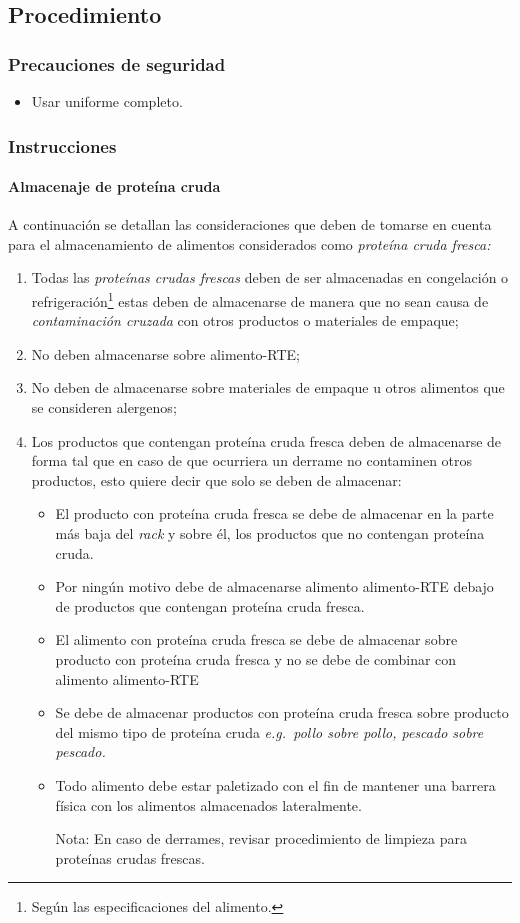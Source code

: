 \subsection{Procedimiento}
\subsubsection{Precauciones de seguridad}
	\begin{itemize}
		\item Usar uniforme completo.
	\end{itemize}

\subsubsection{Instrucciones}
\paragraph{Almacenaje de proteína cruda}
A continuación se detallan las consideraciones que deben de tomarse en cuenta para el almacenamiento de alimentos considerados como \emph{proteína cruda fresca:}
	\begin{enumerate}
		\item Todas las \emph{proteínas crudas frescas} deben de ser almacenadas en congelación o refrigeración\footnote{Según las especificaciones del alimento.} estas deben de almacenarse de manera que no sean causa de \emph{contaminación cruzada} con otros productos o materiales de empaque;
		\item No deben almacenarse sobre \gls{alimento-RTE};
		\item No deben de almacenarse sobre materiales de empaque u otros alimentos que se consideren \glspl{alergeno};
		\item Los productos que contengan proteína cruda fresca deben de almacenarse de forma tal que en caso de que ocurriera un derrame no contaminen otros productos, esto quiere decir que solo se deben de almacenar:
		\begin{itemize}
			\item El producto con proteína cruda fresca se debe de almacenar en la parte más baja del \textit{rack} y sobre él, los productos que no contengan proteína cruda.
			\item Por ningún motivo debe de almacenarse alimento \gls{alimento-RTE} debajo de productos que contengan proteína cruda fresca.
			\item El alimento con proteína cruda fresca se debe de almacenar sobre producto con proteína cruda fresca y no se debe de combinar con alimento \gls{alimento-RTE}
			\item Se debe de almacenar productos con proteína cruda fresca sobre producto del mismo tipo de proteína cruda \textit{e.g.\ pollo sobre pollo, pescado sobre pescado.}
			\item Todo alimento debe estar paletizado con el fin de mantener una barrera física con los alimentos almacenados lateralmente.
			\item[Nota:] En caso de derrames, revisar procedimiento de limpieza para proteínas crudas frescas.
		\end{itemize}
	\end{enumerate}

